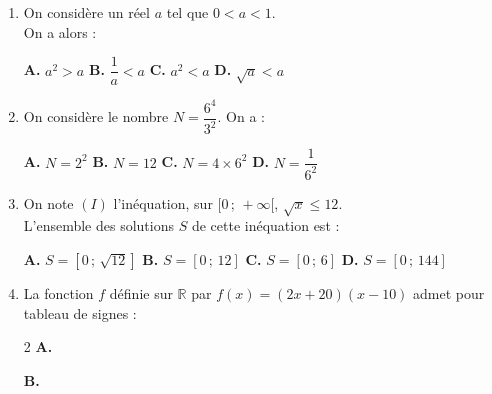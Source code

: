 \documentclass[a4paper,11pt]{article}
\begin{document}
\begin{seanceD}{} %

\begin{enumerate}
\item On considère un réel $a$ tel que $0 < a < 1$. \\On a alors :

\begin{center}
\textbf{\textcolor{Couleur1}{A.}} $a^2 > a$ \qquad \textbf{\textcolor{Couleur1}{B.}} $\dfrac{1}{a} < a$ \qquad \textbf{\textcolor{Couleur1}{C.}} $a^2 < a$ \qquad \textbf{\textcolor{Couleur1}{D.}} $\sqrt{a} < a$
\end{center}


\item On considère le nombre $N=\dfrac{6^4}{3^2}$. On a :

\begin{center}
\textbf{\textcolor{Couleur1}{A.}} $N=2^{2}$ \qquad \textbf{\textcolor{Couleur1}{B.}} $N=12$ \qquad \textbf{\textcolor{Couleur1}{C.}} $N=4\times 6^{2}$ \qquad \textbf{\textcolor{Couleur1}{D.}} $N=\dfrac{1}{6^{2}}$
\end{center}


\item On note $(I)$ l'inéquation, sur $[0\,;\,+\infty[$, $\sqrt{x} \leqslant  12$.
        \\ L'ensemble des solutions $S$ de cette inéquation est :

\begin{center}
\textbf{\textcolor{Couleur1}{A.}} $S = [0\,;\,\sqrt{12}]$ \qquad \textbf{\textcolor{Couleur1}{B.}} $S = [0\,;\,12]$ \qquad \textbf{\textcolor{Couleur1}{C.}} $S = [0\,;\,6]$ \qquad \textbf{\textcolor{Couleur1}{D.}} $S = [0\,;\,144]$
\end{center}


\item La fonction $f$ définie sur $\mathbb{R}$ par $f(x)=(2x+20)(x-10)$ admet pour tableau de signes :\\

\begin{multicols}{2}
\textbf{\textcolor{Couleur1}{A.}} 

\textbf{\textcolor{Couleur1}{B.}} 


\end{multicols}
\end{enumerate}
\end{seanceD}
\end{document}
